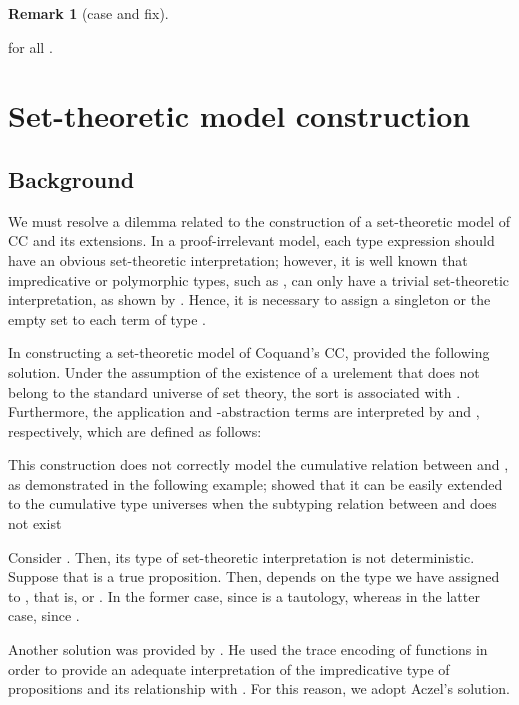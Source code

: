 \documentclass{LMCS}
\theoremstyle{plain}
\theoremstyle{definition}
\newtheorem{remm}[thm]{Remark}
\begin{document}
\begin{remm}[\textsf{case} and \textsf{fix}]
\begin{enumerate}[(1)]
\begin{iteMize}{}
\item  for all .
\end{iteMize}



\section{Set-theoretic model construction}\label{interpretation}

\subsection{Background}
We must resolve a dilemma related to the construction of a set-theoretic model of CC and its extensions. In a proof-irrelevant model, each type expression should have an obvious set-theoretic interpretation; however, it is well known that impredicative or polymorphic types, such as , can only have a trivial set-theoretic interpretation, as shown by \cite{reynolds}. Hence, it is necessary to assign a singleton or the empty set to each term of type . 

In constructing a set-theoretic model of Coquand's CC, \cite{miwe} provided the following solution. Under the assumption of the existence of a urelement  that does not belong to the standard universe of set theory, the sort  is associated with . Furthermore, the application and -abstraction terms are interpreted by  and , respectively, which are defined as follows:


\begin{rem}\label{counter-subtyping}
This construction does not correctly model the cumulative relation between  and , as demonstrated in the following example; \cite{werner-proof} showed that it can be easily extended to the cumulative type universes when the subtyping relation between  and  does not exist\smallskip

Consider . Then, its type of set-theoretic interpretation is not deterministic. Suppose that  is a true proposition. Then,  depends on the type we have assigned to , that is,  or . In the former case,  since  is a tautology, whereas in the latter case,  since . 
\end{rem}

Another solution was provided by \cite{aczel-relating}. He used the trace encoding of functions in order to provide an adequate interpretation of the impredicative type  of propositions and its relationship with . For this reason, we adopt Aczel's solution.


\end{enumerate}
\end{remm}
\end{document}
